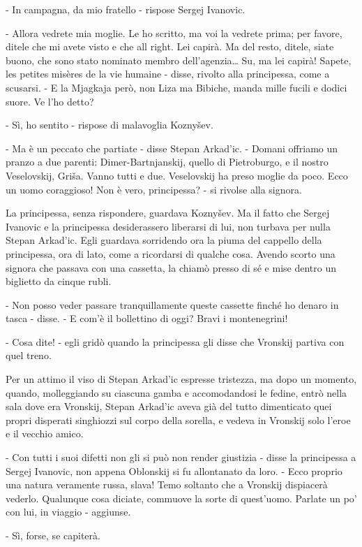 - In campagna, da mio fratello - rispose Sergej Ivanovic. 

- Allora vedrete mia moglie. Le ho scritto, ma voi la vedrete prima; per favore, ditele che mi avete visto e che all right. Lei capirà. Ma del resto, ditele, siate buono, che sono stato nominato membro dell'agenzia\ldots{} Su, ma lei capirà! Sapete, les petites misères de la vie humaine - disse, rivolto alla principessa, come a scusarsi. - E la Mjagkaja però, non Liza ma Bibiche, manda mille fucili e dodici suore. Ve l'ho detto? 

- Sì, ho sentito - rispose di malavoglia Koznyšev. 

- Ma è un peccato che partiate - disse Stepan Arkad'ic. - Domani offriamo un pranzo a due parenti: Dimer-Bartnjanskij, quello di Pietroburgo, e il nostro Veselovskij, Griša. Vanno tutti e due. Veselovskij ha preso moglie da poco. Ecco un uomo coraggioso! Non è vero, principessa? - si rivolse alla signora. 

La principessa, senza rispondere, guardava Koznyšev. Ma il fatto che Sergej Ivanovic e la principessa desiderassero liberarsi di lui, non turbava per nulla Stepan Arkad'ic. Egli guardava sorridendo ora la piuma del cappello della principessa, ora di lato, come a ricordarsi di qualche cosa. Avendo scorto una signora che passava con una cassetta, la chiamò presso di sé e mise dentro un biglietto da cinque rubli. 

- Non posso veder passare tranquillamente queste cassette finché ho denaro in tasca - disse. - E com'è il bollettino di oggi? Bravi i montenegrini! 

- Cosa dite! - egli gridò quando la principessa gli disse che Vronskij partiva con quel treno. 

Per un attimo il viso di Stepan Arkad'ic espresse tristezza, ma dopo un momento, quando, molleggiando su ciascuna gamba e accomodandosi le fedine, entrò nella sala dove era Vronskij, Stepan Arkad'ic aveva già del tutto dimenticato quei propri disperati singhiozzi sul corpo della sorella, e vedeva in Vronskij solo l'eroe e il vecchio amico. 

- Con tutti i suoi difetti non gli si può non render giustizia - disse la principessa a Sergej Ivanovic, non appena Oblonskij si fu allontanato da loro. - Ecco proprio una natura veramente russa, slava! Temo soltanto che a Vronskij dispiacerà vederlo. Qualunque cosa diciate, commuove la sorte di quest'uomo. Parlate un po' con lui, in viaggio - aggiunse. 

- Sì, forse, se capiterà. 

